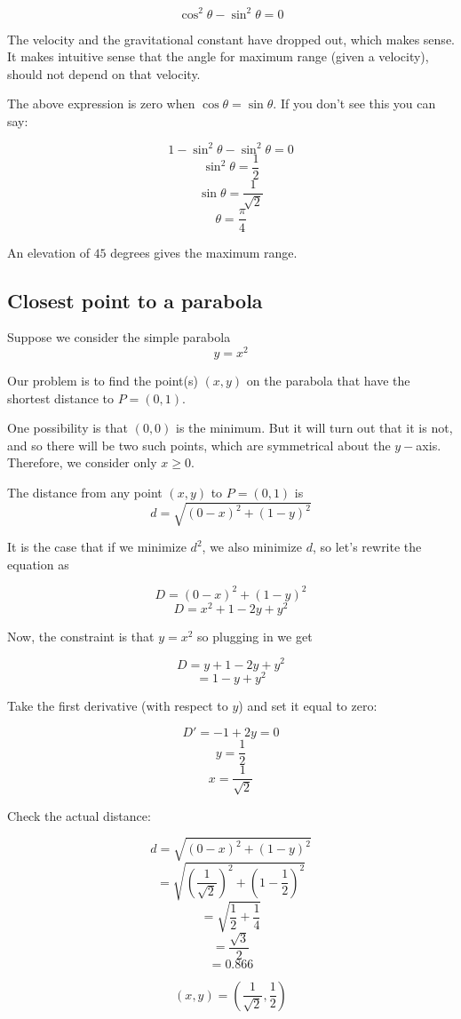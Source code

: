 \documentclass[11pt, oneside]{article}
\begin{document}
\[ \cos^2 \theta - \sin^2 \theta = 0 \]

The velocity and the gravitational constant have dropped out, which makes sense.  It makes intuitive sense that the angle for maximum range (given a velocity), should not depend on that velocity.

The above expression is zero when $\cos \theta = \sin \theta$.  If you don't see this you can say:

\[ 1 - \sin^2 \theta - \sin^2 \theta = 0 \]
\[ \sin^2 \theta = \frac{1}{2} \]
\[ \sin \theta = \frac{1}{\sqrt{2}} \]
\[ \theta = \frac{\pi}{4} \]

An elevation of $45$ degrees gives the maximum range.

\subsection*{Closest point to a parabola}

Suppose we consider the simple parabola
\[ y = x^2 \]

Our problem is to find the point(s) $(x,y)$ on the parabola that have the shortest distance to $P=(0,1)$.

One possibility is that $(0,0)$ is the minimum.  But it will turn out that it is not, and so there will be two such points, which are symmetrical about the $y-$axis.  Therefore, we consider only $x \ge 0$.

The distance from any point $(x,y)$ to $P=(0,1)$ is
\[ d = \sqrt{(0-x)^2 + (1-y)^2} \]

It is the case that if we minimize $d^2$, we also minimize $d$, so let's rewrite the equation as

\[ D = (0-x)^2 + (1-y)^2 \]
\[ D = x^2 + 1 - 2y + y^2 \]

Now, the constraint is that $y=x^2$ so plugging in we get

\[ D = y + 1 - 2y + y^2 \]
\[ = 1 - y + y^2 \]

Take the first derivative (with respect to $y$) and set it equal to zero:

\[ D' = -1 + 2y = 0 \]
\[ y = \frac{1}{2} \]
\[ x = \frac{1}{\sqrt{2}} \]

Check the actual distance:

\[ d = \sqrt{(0-x)^2 + (1-y)^2} \]
\[ = \sqrt{(\frac{1}{\sqrt{2}})^2 + (1- \frac{1}{2})^2 } \]
\[ = \sqrt{\frac{1}{2} + \frac{1}{4}} \]
\[ = \frac{\sqrt{3}}{2} \]
\[ = 0.866 \]

\[ (x,y) = (\frac{1}{\sqrt{2}}, \frac{1}{2}) \]
\end{document}
